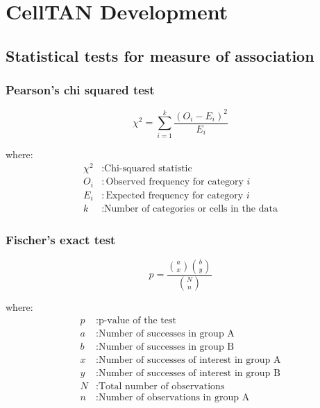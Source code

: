 \chapter{CellTAN Development}

\section{Statistical tests for measure of association} \label{ap1:stats}

\subsection{Pearson's chi squared test} \label{ap1:pearsonschi}

\begin{equation}
    \chi^2 = \sum_{i=1}^{k} \frac{(O_i - E_i)^2}{E_i}
\end{equation}
    
where:
\begin{align*}
\chi^2 & : \text{Chi-squared statistic} \\
O_i & : \text{Observed frequency for category } i \\
E_i & : \text{Expected frequency for category } i \\
k & : \text{Number of categories or cells in the data}
\end{align*}


\subsection{Fischer's exact test} \label{ap1:fischer}

\begin{equation}
    p = \frac{{\binom{a}{x} \binom{b}{y}}}{{\binom{N}{n}}}
\end{equation}

where:
\begin{align*}
    p & : \text{p-value of the test} \\
    a & : \text{Number of successes in group A} \\
    b & : \text{Number of successes in group B} \\
    x & : \text{Number of successes of interest in group A} \\
    y & : \text{Number of successes of interest in group B} \\
    N & : \text{Total number of observations} \\
    n & : \text{Number of observations in group A}
\end{align*}


